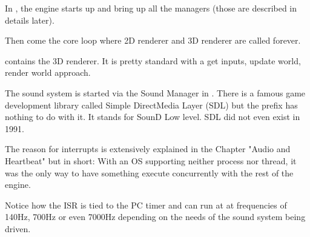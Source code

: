 \documentclass[book.tex]{subfiles}
\begin{document}
\par
In , the engine starts up and bring up all the managers (those are described in details later).\\
\par
\begin{minipage}{\textwidth}

\end{minipage}
\par
Then come the core loop where 2D renderer and 3D renderer are called forever.\\
\par
\begin{minipage}{\textwidth}

\end{minipage}
\par
{} contains the 3D renderer. It is pretty standard with a get inputs, update world, render world approach.\\
\par
\begin{minipage}{\textwidth}

\end{minipage}
\par
The sound system is started via the Sound Manager in . There is a famous game development library called Simple DirectMedia Layer (SDL) but the prefix  has nothing to do with it. It stands for SounD Low level. SDL did not even exist in 1991.\\
\par
The reason for interrupts is extensively explained in the Chapter "Audio and Heartbeat" but in short: With an OS supporting neither process nor thread, it was the only way to have something execute concurrently with the rest of the engine.\\
\par
Notice how the ISR is tied to the PC timer and can run at at frequencies of 140Hz, 700Hz or even 7000Hz depending on the needs of the sound system being driven.\\
\par
\begin{minipage}{\textwidth}

\end{minipage}
\par
\end{document}
